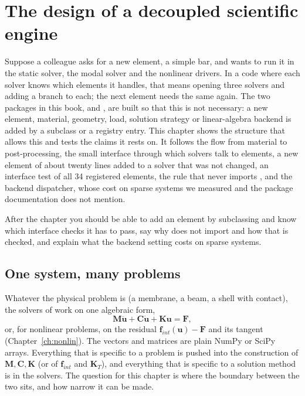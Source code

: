\chapter{The design of a decoupled scientific engine}\label{ch:arch}

\begin{tcolorbox}[colback=gray!5,colframe=gray!50,title={In this chapter}]
Suppose a colleague asks for a new element, a simple bar, and wants to run it in the static solver, the modal solver and the nonlinear drivers. In a code where each solver knows which elements it handles, that means opening three solvers and adding a branch to each; the next element needs the same again. The two packages in this book, \fea{} and \rom{}, are built so that this is not necessary: a new element, material, geometry, load, solution strategy or linear-algebra backend is added by a subclass or a registry entry. This chapter shows the structure that allows this and tests the claims it rests on. It follows the flow from material to post-processing, the small interface through which solvers talk to elements, a new element of about twenty lines added to a solver that was not changed, an interface test of all 34 registered elements, the rule that \rom{} never imports \fea{}, and the backend dispatcher, whose cost on sparse systems we measured and the package documentation does not mention.\par\smallskip
After the chapter you should be able to add an element by subclassing and know which interface checks it has to pass, say why \rom{} does not import \fea{} and how that is checked, and explain what the  backend setting costs on sparse systems.
\end{tcolorbox}

\section{One system, many problems}\label{sec:ar-system}

Whatever the physical problem is (a membrane, a beam, a shell with contact), the solvers of \fea{} work on one algebraic form,
\begin{equation}\label{eq:ar-system}
\bm M\ddot{\bm u}+\bm C\dot{\bm u}+\bm K\bm u=\bm F ,
\end{equation}
or, for nonlinear problems, on the residual $\bm f_{int}(\bm u)-\bm F$ and its tangent (Chapter~\ref{ch:nonlin}). The vectors and matrices are plain NumPy or SciPy arrays. Everything that is specific to a problem is pushed into the construction of $\bm M,\bm C,\bm K$ (or of $\bm f_{int}$ and $\bm K_T$), and everything that is specific to a solution method is in the solvers. The question for this chapter is where the boundary between the two sits, and how narrow it can be made.

